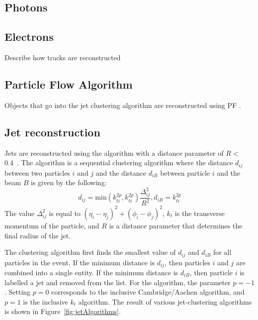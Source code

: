 \subsection{Photons}
\label{sec:phoReco}

\subsection{Electrons}
\label{sec:eleReco}

Describe how tracks are reconstructed

\subsection{Particle Flow Algorithm}
\label{sec:ParticleFlow}
Objects that go into the jet clustering algorithm are reconstructed using PF \cite{ParticleFlow}.

\subsection{Jet reconstruction}
\label{sec:Jet}
Jets are reconstructed using the \antikt algorithm with a distance parameter of $R <$ 0.4~\cite{antikt}.  The \antikt algorithm is a sequential clustering algorithm where the distance $d_{ij}$ between two particles $i$ and $j$ and the distance $d_{iB}$ between particle $i$ and the beam $B$ is given by the following: 
\begin{equation}
d_{ij} = \mathrm{min}(k_{ti}^{2p},k_{ti}^{2p})\frac{\Delta^2_{ij}}{R^2},
d_{iB} =k_{ti}^{2p}
\end{equation}
The value $\Delta^2_{ij}$ is equal to $(\eta_i - \eta_j)^2 + (\phi_i - \phi_j)^2$, $k_t$ is the transverse momentum of the particle, and $R$ is a distance parameter that determines the final radius of the jet.

The clustering algorithm first finds the smallest value of $d_{ij}$ and $d_{iB}$ for all particles in the event. If the minimum distance is $d_{ij}$, then particles $i$ and $j$ are combined into a single entity. If the minimum distance is $d_{iB}$, then particle $i$ is labelled a jet and removed from the list. For the \antikt algorithm, the parameter $p = -1$. Setting $p=0$ corresponds to the inclusive Cambridge/Aachen algorithm, and $p=1$ is the inclusive $k_t$ algorithm. The result of various jet-clustering algorithms is shown in Figure~\ref{fig:jetAlgorithms}.
 
